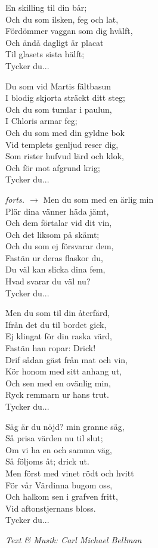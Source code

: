 En skilling til din bår;\\
Och du som ilsken, feg och lat,\\
Fördömmer vaggan som dig hvälft,\\
Och ändå dagligt är placat\\
Til glasets sista hälft;\\
Tycker du...\par
\vspace{10pt}		  
Du som vid Martis fältbasun\\
I blodig skjorta sträckt ditt steg;\\
Och du som tumlar i paulun,\\
I Chloris armar feg;\\
Och du som med din gyldne bok\\
Vid templets genljud reser dig,\\
Som rister hufvud lärd och klok,\\
Och för mot afgrund krig;\\
Tycker du...\par
\vfill
\hfill {\footnotesize\textit{forts. $\rightarrow$}}
\newpage
Men du som med en ärlig min\\
Plär dina vänner häda jämt,\\
Och dem förtalar vid dit vin,\\
Och det liksom på skämt;\\
Och du som ej försvarar dem,\\
Fastän ur deras flaskor du,\\
Du väl kan slicka dina fem,\\
Hvad svarar du väl nu?\\
Tycker du...\par
\vspace{10pt}
Men du som til din återfärd,\\
Ifrån det du til bordet gick,\\
Ej klingat för din raska värd,\\
Fastän han ropar: Drick!\\
Drif sådan gäst från mat och vin,\\
Kör honom med sitt anhang ut,\\
Och sen med en ovänlig min,\\
Ryck remmarn ur hans trut.\\
Tycker du...\par
\vspace{10pt}				   
Säg är du nöjd? min granne säg,\\
Så prisa värden nu til slut;\\
Om vi ha en och samma väg,\\
Så följoms åt; drick ut.\\
Men först med vinet rödt och hvitt\\
För vår Värdinna bugom oss,\\
Och halkom sen i grafven fritt,\\
Vid aftonstjernans bloss.\\
Tycker du...\par
\vspace{10pt}
{\footnotesize\textit{Text \& Musik: Carl Michael Bellman}} 
